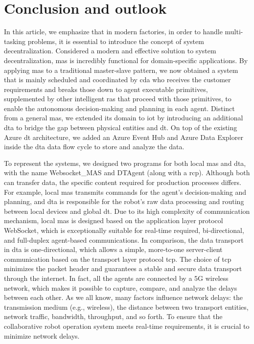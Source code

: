 \chapter{Conclusion and outlook}

In this article, we emphasize that in modern factories, in order to handle 
multi-tasking problems, it is essential to introduce the concept of system 
decentralization. Considered a modern and effective solution to system 
decentralization, \gls{mas} is incredibly functional for domain-specific 
applications. By applying \gls{mas} to a traditional master-slave\cite{egger_deployment-friendly_2020} 
pattern, we now obtained a system that is mainly scheduled and coordinated 
by \gls{cda} who receives the customer requirements and breaks those down to agent 
executable primitives, supplemented by other intelligent \gls{ras} that proceed 
with those primitives, to enable the 
autonomous decision-making and planning in each agent. Distinct from a 
general \gls{mas}, we extended its domain to \gls{iot} by 
introducing an additional \gls{dta} to bridge the gap between physical 
entities and \gls{dt}. On top of the existing Azure \gls{dt} architecture, we 
added an Azure Event Hub and Azure Data Explorer inside the \gls{dta} data 
flow cycle to store and analyze the data. 


To represent the systems, we designed two programs for both local 
\gls{mas} and \gls{dta}, with the name Websocket\_MAS and DTAgent 
(along with a \gls{rcp}). Although both can transfer data, the 
specific content required for production processes differs. For 
example, local \gls{mas} transmits commands for the agent's decision-making 
and planning, and \gls{dta} is responsible for the robot's raw data processing 
and routing between local devices and global \gls{dt}. Due to its high complexity 
of communication mechanism, local \gls{mas} is designed based on the application 
layer protocol WebSocket, which is exceptionally suitable for real-time required, 
bi-directional, and full-duplex agent-based communications. 
In comparison, the data transport in \gls{dta} is one-directional, which allows 
a simple, more-to-one server-client communication based on the transport layer 
protocol \gls{tcp}. The choice of \gls{tcp} minimizes the packet header and 
guarantees a stable and secure data transport through the internet. In fact, 
all the agents are connected by a 5G wireless network, which makes it possible 
to capture, compare, and analyze the delays between each other. As we all know, 
many factors influence network delays: the transmission medium (e.g., wireless), 
the distance between two transport entities, network traffic, bandwidth, 
throughput, and so forth. To ensure that the collaborative robot operation 
system meets real-time requirements, it is crucial to minimize network delays. 




